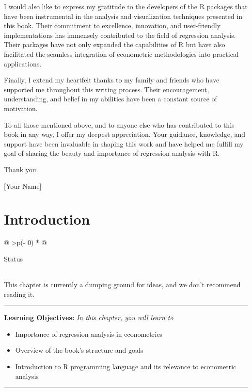 \documentclass[
  letterpaper,
  paper =a4,
  twoside,
  openright,
  headsepline,
  footsepline,
  listof = totocnumbered,
  chapterprefix = true,
  firstiscover]{scrbook}
\providecommand{\abstractname}{Learning Objectives} %
\newenvironment{objectives}[1]{%
	\hrule
	\vspace{5pt}
	\small\textbf{\abstractname: } 
	\newline
	\vspace{0.1cm}
	\small\emph{#1} %
	\itshape %
}{%
	\vspace{5pt}
	\hrule
	\vspace{0.6cm}
}
\begin{document}
I would also like to express my gratitude to the developers of the R
packages that have been instrumental in the analysis and visualization
techniques presented in this book. Their commitment to excellence,
innovation, and user-friendly implementations has immensely contributed
to the field of regression analysis. Their packages have not only
expanded the capabilities of R but have also facilitated the seamless
integration of econometric methodologies into practical applications.

Finally, I extend my heartfelt thanks to my family and friends who have
supported me throughout this writing process. Their encouragement,
understanding, and belief in my abilities have been a constant source of
motivation.

To all those mentioned above, and to anyone else who has contributed to
this book in any way, I offer my deepest appreciation. Your guidance,
knowledge, and support have been invaluable in shaping this work and
have helped me fulfill my goal of sharing the beauty and importance of
regression analysis with R.

Thank you.

{[}Your Name{]}


\hypertarget{introduction}{%
\chapter{Introduction}\label{introduction}}

\begin{longtable}[]{@{}
  >{\centering\arraybackslash}p{(\columnwidth - 0\tabcolsep) * }@{}}
\toprule\noalign{}
\begin{minipage}[b]{\linewidth}\centering
Status
\end{minipage} \\
\midrule\noalign{}
\endhead
\bottomrule\noalign{}
\endlastfoot
This chapter is currently a dumping ground for ideas, and we don't
recommend reading it. \\
\end{longtable}

\begin{objectives}{In this chapter, you will learn to}
\begin{itemize}

\item{Importance of regression analysis in econometrics}

\item{Overview of the book's structure and goals}

\item{Introduction to R programming language and its relevance to econometric analysis}

\end{itemize}

\end{objectives}
\end{document}
